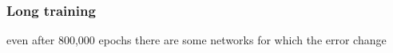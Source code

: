 
\subsubsection{Long training} 
even after 800,000 epochs there are some networks for which the error change
